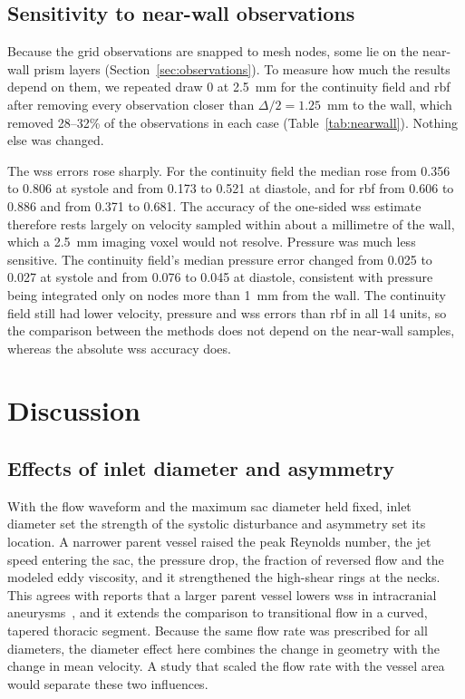\documentclass[12pt,a4paper]{article}
\newcommand{\WSS}{\ac{wss}\xspace}
\newcommand{\RBF}{\ac{rbf}\xspace}
\theoremstyle{definition}
\numberwithin{equation}{section}
\begin{document}



\subsection{Sensitivity to near-wall observations}
\label{sec:nearwall}
Because the grid observations are snapped to mesh nodes, some lie on the near-wall prism layers (Section~\ref{sec:observations}). To measure how much the results depend on them, we repeated draw 0 at 2.5~mm for the continuity field and \RBF after removing every observation closer than $\Delta/2=1.25$~mm to the wall, which removed 28--32\% of the observations in each case (Table~\ref{tab:nearwall}). Nothing else was changed.

The \WSS errors rose sharply. For the continuity field the median rose from 0.356 to 0.806 at systole and from 0.173 to 0.521 at diastole, and for \RBF from 0.606 to 0.886 and from 0.371 to 0.681. The accuracy of the one-sided \WSS estimate therefore rests largely on velocity sampled within about a millimetre of the wall, which a 2.5~mm imaging voxel would not resolve. Pressure was much less sensitive. The continuity field's median pressure error changed from 0.025 to 0.027 at systole and from 0.076 to 0.045 at diastole, consistent with pressure being integrated only on nodes more than 1~mm from the wall. The continuity field still had lower velocity, pressure and \WSS errors than \RBF in all 14 units, so the comparison between the methods does not depend on the near-wall samples, whereas the absolute \WSS accuracy does.




\section{Discussion}
\label{sec:discussion}
\subsection{Effects of inlet diameter and asymmetry}
With the flow waveform and the maximum sac diameter held fixed, inlet diameter set the strength of the systolic disturbance and asymmetry set its location. A narrower parent vessel raised the peak Reynolds number, the jet speed entering the sac, the pressure drop, the fraction of reversed flow and the modeled eddy viscosity, and it strengthened the high-shear rings at the necks. This agrees with reports that a larger parent vessel lowers \WSS in intracranial aneurysms~\cite{fattahi2023influence}, and it extends the comparison to transitional flow in a curved, tapered thoracic segment. Because the same flow rate was prescribed for all diameters, the diameter effect here combines the change in geometry with the change in mean velocity. A study that scaled the flow rate with the vessel area would separate these two influences.
\end{document}
